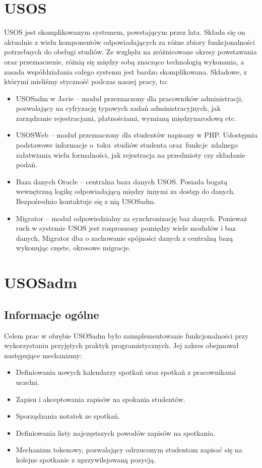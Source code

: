 \documentclass[licencjacka]{pracamgr}
\begin{document}
\section{USOS}
USOS jest skomplikowanym systemem, powstającym przez lata. Składa się on aktualnie z wielu komponentów odpowiadających za różne zbiory funkcjonalności potrzebnych do obsługi studiów. Ze względu na zróżnicowane okresy powstawania oraz przeznaczenie, różnią się między sobą znacząco technologią wykonania, a zasada współdziałania całego systemu jest bardzo skomplikowana.
Składowe, z którymi mieliśmy styczność podczas naszej pracy, to:
\begin{itemize}
\item USOSadm w Javie -- moduł przeznaczony dla pracowników administracji, pozwalający na cyfryzację typowych zadań administracyjnych, jak zarządzanie rejestracjami, płatnościami, wymianą międzynarodową etc.
\item USOSWeb -- moduł przeznaczony dla studentów napisany w PHP. Udostępnia podstawowe informacje o~toku~studiów studenta oraz~funkcje~zdalnego załatwiania wielu formalności, jak rejestracja na przedmioty czy składanie podań.
\item Baza danych Oracle -- centralna baza danych USOS. Posiada bogatą wewnętrzną logikę odpowiadającą między innymi za dostęp do danych. Bezpośrednio kontaktuje się z nią USOSadm.
\item Migrator -- moduł odpowiedzialny za synchronizację baz danych. Ponieważ ruch w systemie USOS jest rozproszony pomiędzy wiele modułów i baz danych, Migrator dba o zachowanie spójności danych z centralną bazą wykonując częste, okresowe migracje.
\end{itemize}

\section{USOSadm} \label{sec:impusos}

\subsection{Informacje ogólne}
Celem prac w obrębie USOSadm było zaimplementowanie funkcjonalności przy wykorzystaniu przyjętych praktyk programistycznych. Jej zakres obejmował następujące mechanizmy:
\begin{itemize}
\item Definiowania nowych kalendarzy spotkań oraz spotkań z pracownikami uczelni.
\item Zapisu i akceptowania zapisów na spokania studentów.
\item Sporządzania notatek ze spotkań.
\item Definiowania listy najczęstszych powodów zapisów na spotkania.
\item Mechanizm tokenowy, pozwalający odrzuconym studentom zapisać się na kolejne spotkanie z uprzywilejowaną pozycją.
\end{itemize}
\end{document}
